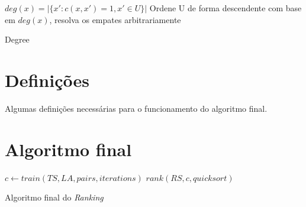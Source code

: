 \begin{algorithm}
\begin{algorithmic}

\STATE $deg(x) = |\{x': c(x, x')=1, x'\in U\}|$
\ENDFOR
\STATE Ordene U de forma descendente com base em $deg(x)$, resolva os empates arbitrariamente

\caption{Degree}
\label{alg:degree}

\end{algorithmic}
\end{algorithm}


\section{Definições}
Algumas definições necessárias para o funcionamento do algoritmo final.

\section{Algoritmo final}

\begin{algorithm}
\begin{algorithmic}

\STATE $c \gets train(TS, LA, pairs, iterations)$
\STATE $rank(RS, c, quicksort)$

\caption{Algoritmo final do \emph{Ranking}}
\label{alg:ranking}

\end{algorithmic}
\end{algorithm}
